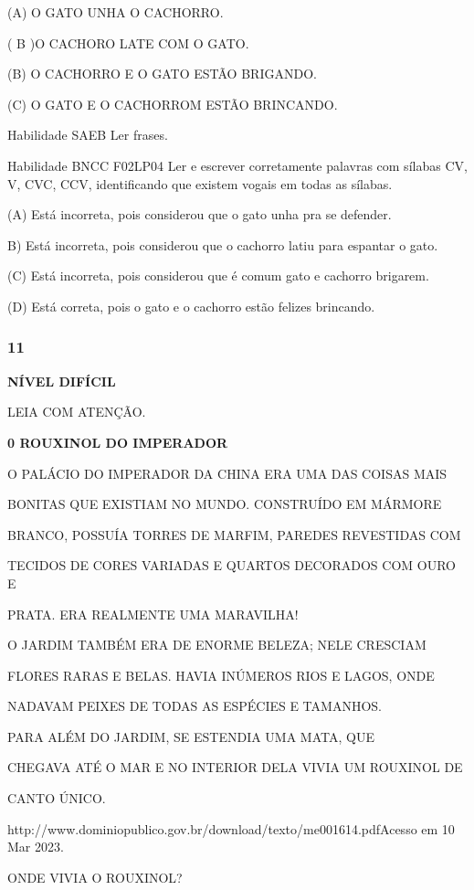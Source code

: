 (A) O GATO UNHA O CACHORRO.

( B )O CACHORO LATE COM O GATO.

(B) O CACHORRO E O GATO ESTÃO BRIGANDO.

(C) O GATO E O CACHORROM ESTÃO BRINCANDO.

\protect\hypertarget{_Hlk129376594}{}{}Habilidade SAEB Ler frases.

Habilidade BNCC F02LP04 Ler e escrever corretamente palavras com sílabas
CV, V, CVC, CCV, identificando que existem vogais em todas as sílabas.

(A) Está incorreta, pois considerou que o gato unha pra se defender.

B) Está incorreta, pois considerou que o cachorro latiu para espantar o
gato.

(C) Está incorreta, pois considerou que é comum gato e cachorro
brigarem.

(D) Está correta, pois o gato e o cachorro estão felizes brincando.

\subsubsection{11}\label{section-121}

\textbf{NÍVEL DIFÍCIL}

LEIA COM ATENÇÃO.

\textbf{0 ROUXINOL DO IMPERADOR}

O PALÁCIO DO IMPERADOR DA CHINA ERA UMA DAS COISAS MAIS

BONITAS QUE EXISTIAM NO MUNDO. CONSTRUÍDO EM MÁRMORE

BRANCO, POSSUÍA TORRES DE MARFIM, PAREDES REVESTIDAS COM

TECIDOS DE CORES VARIADAS E QUARTOS DECORADOS COM OURO E

PRATA. ERA REALMENTE UMA MARAVILHA!

O JARDIM TAMBÉM ERA DE ENORME BELEZA; NELE CRESCIAM

FLORES RARAS E BELAS. HAVIA INÚMEROS RIOS E LAGOS, ONDE

NADAVAM PEIXES DE TODAS AS ESPÉCIES E TAMANHOS.

PARA ALÉM DO JARDIM, SE ESTENDIA UMA MATA, QUE

CHEGAVA ATÉ O MAR E NO INTERIOR DELA VIVIA UM ROUXINOL DE

CANTO ÚNICO.

http://www.dominiopublico.gov.br/download/texto/me001614.pdfAcesso em 10
Mar 2023.

ONDE VIVIA O ROUXINOL?

